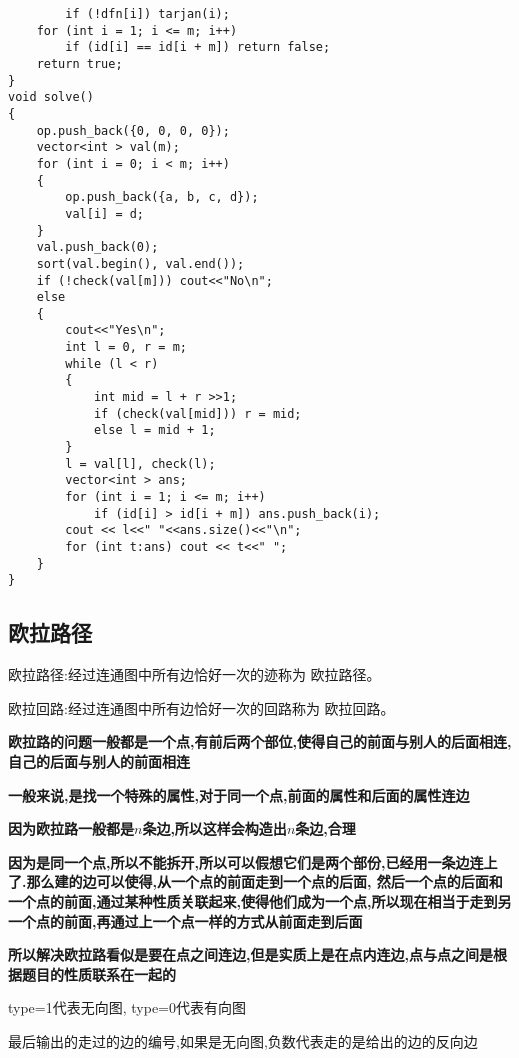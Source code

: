\documentclass[a4paper, fontset=none]{ctexart}
\begin{document}
\begin{verbatim}
        if (!dfn[i]) tarjan(i);
    for (int i = 1; i <= m; i++)
        if (id[i] == id[i + m]) return false;
    return true;
}
void solve()
{
    op.push_back({0, 0, 0, 0});
    vector<int > val(m);
    for (int i = 0; i < m; i++)
    {
        op.push_back({a, b, c, d});
        val[i] = d;
    }
    val.push_back(0);
    sort(val.begin(), val.end());
    if (!check(val[m])) cout<<"No\n";
    else
    {
        cout<<"Yes\n";
        int l = 0, r = m;
        while (l < r)
        {
            int mid = l + r >>1;
            if (check(val[mid])) r = mid;
            else l = mid + 1;
        }
        l = val[l], check(l);
        vector<int > ans;
        for (int i = 1; i <= m; i++)
            if (id[i] > id[i + m]) ans.push_back(i);
        cout << l<<" "<<ans.size()<<"\n";
        for (int t:ans) cout << t<<" ";
    }
}
\end{verbatim}

\subsection{欧拉路径}

欧拉路径:经过连通图中所有边恰好一次的迹称为 欧拉路径。

欧拉回路:经过连通图中所有边恰好一次的回路称为 欧拉回路。

\textbf{欧拉路的问题一般都是一个点,有前后两个部位,使得自己的前面与别人的后面相连,自己的后面与别人的前面相连}

\textbf{一般来说,是找一个特殊的属性,对于同一个点,前面的属性和后面的属性连边}

\textbf{因为欧拉路一般都是$n$条边,所以这样会构造出$n$条边,合理}

\textbf{因为是同一个点,所以不能拆开,所以可以假想它们是两个部份,已经用一条边连上了.那么建的边可以使得,从一个点的前面走到一个点的后面,
然后一个点的后面和一个点的前面,通过某种性质关联起来,使得他们成为一个点,所以现在相当于走到另一个点的前面,再通过上一个点一样的方式从前面走到后面}

\textbf{所以解决欧拉路看似是要在点之间连边,但是实质上是在点内连边,点与点之间是根据题目的性质联系在一起的}

type=1代表无向图, type=0代表有向图

最后输出的走过的边的编号,如果是无向图,负数代表走的是给出的边的反向边
\end{document}
